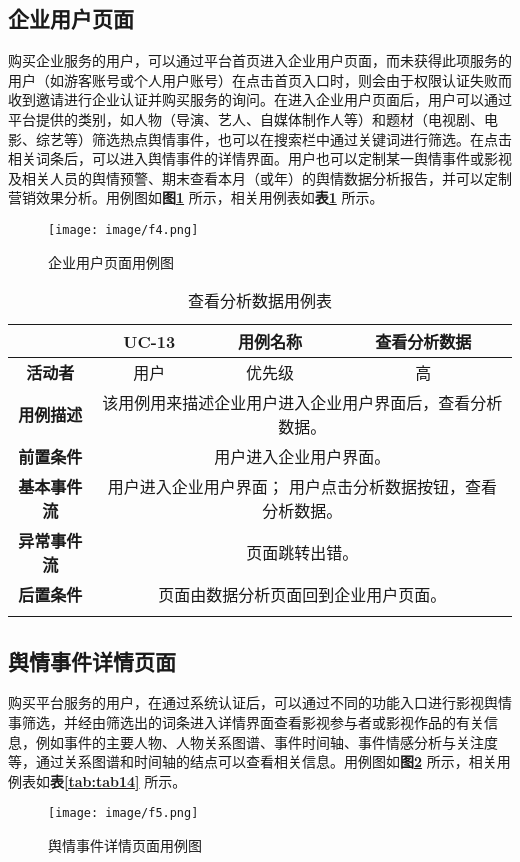\subsection{企业用户页面}
购买企业服务的用户，可以通过平台首页进入企业用户页面，而未获得此项服务的用户（如游客账号或个人用户账号）在点击首页入口时，则会由于权限认证失败而收到邀请进行企业认证并购买服务的询问。在进入企业用户页面后，用户可以通过平台提供的类别，如人物（导演、艺人、自媒体制作人等）和题材（电视剧、电影、综艺等）筛选热点舆情事件，也可以在搜索栏中通过关键词进行筛选。在点击相关词条后，可以进入舆情事件的详情界面。用户也可以定制某一舆情事件或影视及相关人员的舆情预警、期末查看本月（或年）的舆情数据分析报告，并可以定制营销效果分析。用例图如\textbf{图\ref{fig:fig4}} 所示，相关用例表如\textbf{表\ref{tab:tab13}} 所示。
\begin{figure}[!htb]
	\centering\label{fig:fig4}
	\texttt{[image: image/f4.png]}
	\caption{企业用户页面用例图}
\end{figure}

\begin{longtable}[c]{c|ccc}
	\caption{查看分析数据用例表}
	\label{tab:tab13}\\
	\shline
	\multicolumn{1}{c|}{\textbf{用例编号}} & \multicolumn{1}{c|}{UC-13} & \multicolumn{1}{c|}{用例名称} &  查看分析数据\\ \hline
	\endhead
	\multicolumn{1}{c|}{\textbf{活动者}} & \multicolumn{1}{c|}{用户} & \multicolumn{1}{c|}{优先级} &高  \\ \hline
	\textbf{用例描述} & \multicolumn{3}{p{12cm}}{该用例用来描述企业用户进入企业用户界面后，查看分析数据。} \\ \hline
	\textbf{前置条件}& \multicolumn{3}{p{12cm}}{用户进入企业用户界面。} \\ \hline
	\textbf{基本事件流}& \multicolumn{3}{p{12cm}}{用户进入企业用户界面；\newline
	    用户点击分析数据按钮，查看分析数据。
	} \\ \hline
	\textbf{异常事件流}& \multicolumn{3}{p{12cm}}{页面跳转出错。
	} \\ \hline
	\textbf{后置条件}& \multicolumn{3}{p{12cm}}{页面由数据分析页面回到企业用户页面。} \\ \shline
\end{longtable}

\subsection{舆情事件详情页面}
购买平台服务的用户，在通过系统认证后，可以通过不同的功能入口进行影视舆情事筛选，并经由筛选出的词条进入详情界面查看影视参与者或影视作品的有关信息，例如事件的主要人物、人物关系图谱、事件时间轴、事件情感分析与关注度等，通过关系图谱和时间轴的结点可以查看相关信息。用例图如\textbf{图\ref{fig:fig5}} 所示，相关用例表如\textbf{表\ref{tab:tab14}} 所示。
\newpage
\begin{figure}[!htb]
	\centering\label{fig:fig5}
	\texttt{[image: image/f5.png]}
	\caption{舆情事件详情页面用例图}
\end{figure}

